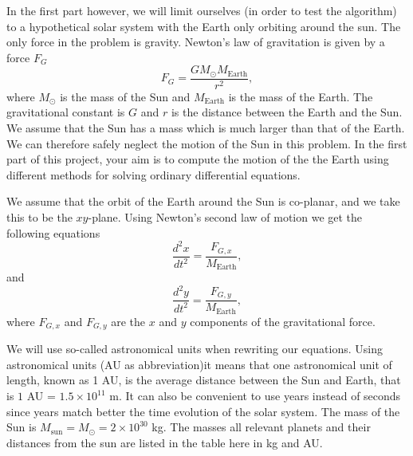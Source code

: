 \documentclass[%
oneside,                 %
final,                   %
10pt]{article}
\begin{document}
In the first part however, we will limit ourselves (in order to test the algorithm) 
to a hypothetical solar system
with the Earth only orbiting around the sun.
The only force in the problem is gravity. Newton's law of gravitation  is given by a force $F_G$
\[
F_G=\frac{GM_{\odot}M_{\mathrm{Earth}}}{r^2},
\]
where $M_{\odot}$ is the mass of the Sun and $M_{\mathrm{Earth}}$ is the mass of the Earth. The gravitational constant is $G$ and $r$ is the distance between the Earth and the Sun.
We assume that the Sun has a mass which is much larger 
than that of the Earth. We can therefore safely neglect the 
motion of the Sun in this problem.  In the first part of this project, your aim is to compute the motion
of the the Earth using different methods for solving ordinary differential equations.

We assume that the orbit of the Earth around the Sun 
is co-planar, and we take this to be the $xy$-plane.
Using Newton's second law of motion we get the following equations
\[
\frac{d^2x}{dt^2}=\frac{F_{G,x}}{M_{\mathrm{Earth}}},
\]
and 
\[
\frac{d^2y}{dt^2}=\frac{F_{G,y}}{M_{\mathrm{Earth}}},
\]
where $F_{G,x}$ and $F_{G,y}$ are the $x$ and $y$ components of the gravitational force. 

We will use so-called astronomical units when rewriting our equations. 
Using astronomical units (AU as abbreviation)it means that 
one astronomical unit of length, known as 1 AU, is the average distance between the Sun and Earth, that is
$1$ AU = $1.5\times 10^{11}$ m.  It can also be convenient to use years instead of seconds since years match
better the time evolution of the solar system. The mass of the Sun is $M_{\mathrm{sun}}=M_{\odot}=2\times 10^{30}$ kg. The masses all relevant planets and their distances from the sun are listed in the table here in kg and AU.
\end{document}
